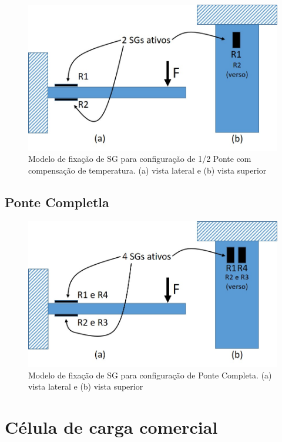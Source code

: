 \documentclass[a4paper]{instrumentacao}
\begin{document}
\begin{figure}[H]
\center
\includegraphics[width=\textwidth]{1-2 ponte_2.jpg}
\caption{Modelo de fixação de SG para configuração de 1/2 Ponte com compensação de temperatura. (a) vista lateral e (b) vista superior}
\label{fig:1-2 ponte_com temp}
\end{figure}

\subsection{Ponte Completla}

\begin{figure}[H]
\center
\includegraphics[width=\textwidth]{ponte completa.jpg}
\caption{Modelo de fixação de SG para configuração de Ponte Completa. (a) vista lateral e (b) vista superior}
\label{fig:1-2 ponte_com temp}
\end{figure}

\section{Célula de carga comercial}
\end{document}
